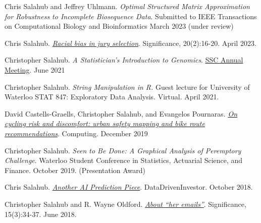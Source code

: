 \documentclass[a4paper,11pt]{article}
\newenvironment{compactDesc}
{ \begin{description}
		\setlength{\itemsep}{2pt}
		\setlength{\parskip}{2pt}
		\setlength{\parsep}{1pt}     }
	{ \end{description}                  }
\begin{document}
\vspace{0.2cm}
 \hrulefill

\begin{compactDesc}
	\item 
	Chris Salahub and Jeffrey Uhlmann. \textit{Optimal Structured Matrix Approximation for Robustness to Incomplete Biosequence Data}. Submitted to IEEE Transactions on Computational Biology and Bioinformatics March 2023 (under review)
	\item
	Chris Salahub. \href{https://academic.oup.com/jrssig/article/20/2/16/7095719}{\textit{Racial bias in jury selection}}. Significance, 20(2):16-20. April 2023.
	\item
	Christopher Salahub. \textit{A Statistician's Introduction to Genomics}. \href{https://ssc.ca/en/meetings/past}{SSC Annual Meeting}. June 2021
	\item
	Christopher Salahub. \textit{String Manipulation in R.} Guest lecture for University of Waterloo STAT 847: Exploratory Data Analysis. Virtual. April 2021.
	\item
	David Castells-Graells, Christopher Salahub, and Evangelos Pournaras. \href{https://link.springer.com/article/10.1007\%2Fs00607-019-00771-y}{\textit{On cycling risk and discomfort: urban safety mapping and bike route recommendations}}. Computing. December 2019
	\item 
	Christopher Salahub. \textit{Seen to Be Done: A Graphical Analysis of Peremptory Challenge}. Waterloo Student Conference in Statistics, Actuarial Science, and Finance. October 2019. (Presentation Award)
	\item
	Chris Salahub. \href{https://medium.com/datadriveninvestor/another-ai-prediction-piece-45f36e6398a}{\textit{Another AI Prediction Piece}}. DataDrivenInvestor. October 2018.
	\item
	Christopher Salahub and R. Wayne Oldford. \href{https://rss.onlinelibrary.wiley.com/doi/full/10.1111/j.1740-9713.2018.01148.x}{\textit{About ``her emails''}}. Significance, 15(3):34-37. June 2018. 
\end{compactDesc}
\end{document}
